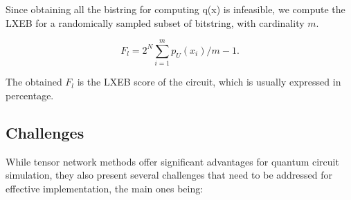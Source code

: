 \documentclass[12pt,oneside,a4paper]{article}
\begin{document}
Since obtaining all the bistring for computing q(x) is infeasible, we compute the LXEB for a randomically sampled subset of bitstring, with cardinality $m$.

\begin{equation}
    F_l = 2^N \sum_{i=1}^m p_U(x_i)/m - 1.
\end{equation}

The obtained $F_l$ is the LXEB score of the circuit, which is usually expressed in percentage.

\subsection{Challenges}
While tensor network methods offer significant advantages for quantum circuit simulation, they also present several challenges that need to be addressed for effective implementation, the main ones being:
\end{document}
